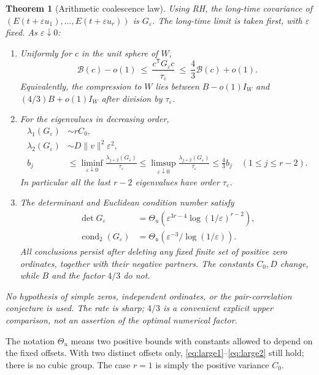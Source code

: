 \documentclass[11pt]{article}
\newtheorem{theorem}{Theorem}[section]
\theoremstyle{definition}\newtheorem{definition}[theorem]{Definition}
\theoremstyle{remark}\newtheorem{remark}[theorem]{Remark}
\newcommand{\eps}{\varepsilon}
\newcommand{\tr}{\mathsf T}
\newcommand{\tauE}{\tau_\eps}
\newcommand{\bB}{\mathcal B}
\begin{document}
\begin{theorem}[Arithmetic coalescence law]\label{thm:main}
Using RH, the long-time covariance of
$(E(t+\eps u_1),\ldots,E(t+\eps u_r))$ is $G_\eps$.
The long-time limit is taken first, with $\eps$ fixed. As $\eps\downarrow0$:
\begin{enumerate}[label=(\roman*),leftmargin=*]
\item Uniformly for $c$ in the unit sphere of $W$,
\begin{equation}\label{eq:bracket}
 \bB(c)-o(1)\ \le\ \frac{c^\tr G_\eps c}{\tauE}
 \ \le\ \frac43\bB(c)+o(1).
\end{equation}
Equivalently, the compression to $W$ lies between
$B-o(1)I_W$ and $(4/3)B+o(1)I_W$ after division by $\tauE$.
\item For the eigenvalues in decreasing order,
\begin{align}
 \lambda_1(G_\eps)&\sim rC_0,\label{eq:large1}\\
 \lambda_2(G_\eps)&\sim D\|v\|^2\eps^2,\label{eq:large2}\\
 b_j&\le\liminf_{\eps\downarrow0}\frac{\lambda_{j+2}(G_\eps)}{\tauE}
 \le\limsup_{\eps\downarrow0}\frac{\lambda_{j+2}(G_\eps)}{\tauE}
 \le\frac43 b_j \quad(1\le j\le r-2).\label{eq:small}
\end{align}
In particular all the last $r-2$ eigenvalues have order $\tauE$.
\item The determinant and Euclidean condition number satisfy
\begin{align}
 \det G_\eps&=\Theta_u\!\left(
      \eps^{3r-4}\log(1/\eps)^{r-2}\right),\label{eq:det}\\
 \operatorname{cond}_2(G_\eps)&=
      \Theta_u\!\left(\eps^{-3}/\log(1/\eps)\right).
\end{align}
All conclusions persist after deleting any fixed finite set of positive
zero ordinates, together with their negative partners. The constants
$C_0,D$ change, while $B$ and the factor $4/3$ do not.
\end{enumerate}
No hypothesis of simple zeros, independent ordinates, or the
pair-correlation conjecture is used. The rate is sharp; $4/3$ is a
convenient explicit upper comparison, not an assertion of the optimal
numerical factor.
\end{theorem}

The notation $\Theta_u$ means two positive bounds with constants allowed
to depend on the fixed offsets. With two distinct offsets only,
\eqref{eq:large1}--\eqref{eq:large2} still hold; there is no cubic group.
The case $r=1$ is simply the positive variance $C_0$.
\end{document}
